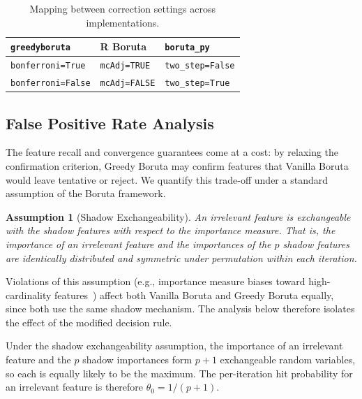 \documentclass[runningheads]{llncs}
\newtheorem{assumption}{Assumption}
\begin{document}
\begin{table}[t]
\centering
\caption{Mapping between correction settings across implementations.}
\label{tab:correction_mapping}
\begin{tabular}{lll}
\toprule
\texttt{greedyboruta} & R Boruta & \texttt{boruta\_py} \\
\midrule
\texttt{bonferroni=True}  & \texttt{mcAdj=TRUE}  & \texttt{two\_step=False} \\
\texttt{bonferroni=False} & \texttt{mcAdj=FALSE} & \texttt{two\_step=True}\footnotemark \\
\bottomrule
\end{tabular}
\end{table}


\subsection{False Positive Rate Analysis}
\label{sec:method:fpr}

The feature recall and convergence guarantees come at a cost: by relaxing the confirmation criterion, Greedy Boruta may confirm features that Vanilla Boruta would leave tentative or reject. We quantify this trade-off under a standard assumption of the Boruta framework.

\begin{assumption}[Shadow Exchangeability]
\label{asm:exchangeability}
An irrelevant feature is exchangeable with the shadow features with respect to the importance measure. That is, the importance of an irrelevant feature and the importances of the $p$ shadow features are identically distributed and symmetric under permutation within each iteration.
\end{assumption}

Violations of this assumption (e.g., importance measure biases toward high-cardinality features~\cite{strobl2007bias}) affect both Vanilla Boruta and Greedy Boruta equally, since both use the same shadow mechanism. The analysis below therefore isolates the effect of the modified decision rule.

Under the shadow exchangeability assumption, the importance of an irrelevant feature and the $p$ shadow importances form $p+1$ exchangeable random variables, so each is equally likely to be the maximum. The per-iteration hit probability for an irrelevant feature is therefore $\theta_0 = 1/(p+1)$.
\end{document}
